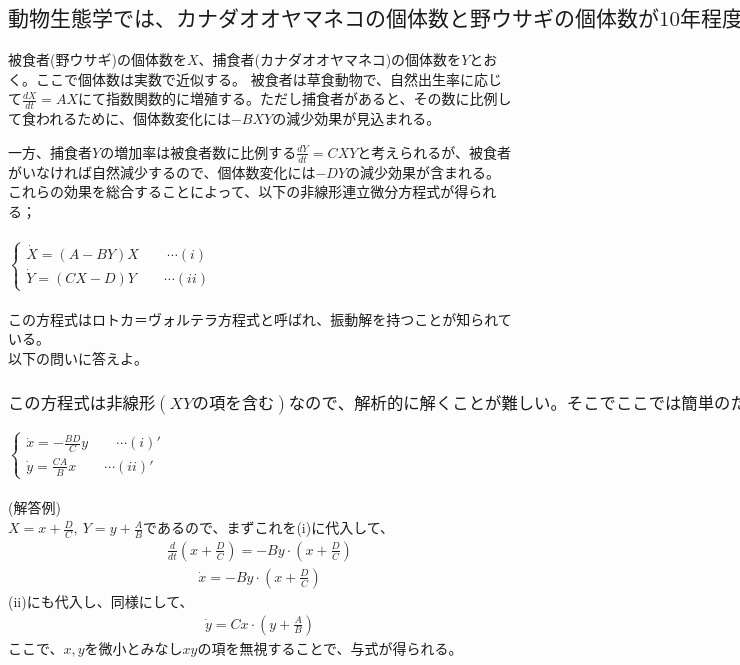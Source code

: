 \documentclass[a4paper,11pt,fleqn]{jarticle}
\begin{document}
\subsection{$動物生態学では、カナダオオヤマネコの個体数と野ウサギの個体数が10年程度の時間で振動することが知られている。以下、このダイナミクスを簡単なモデルで数理化することを考える。$}
被食者(野ウサギ)の個体数を$X$、捕食者(カナダオオヤマネコ)の個体数を$Y$とおく。ここで個体数は実数で近似する。
被食者は草食動物で、自然出生率に応じて$\frac{dX}{dt}=AX$にて指数関数的に増殖する。ただし捕食者があると、その数に比例して食われるために、個体数変化には$-BXY$の減少効果が見込まれる。\par
一方、捕食者$Y$の増加率は被食者数に比例する$\frac{dY}{dt}=CXY$と考えられるが、被食者がいなければ自然減少するので、個体数変化には$-DY$の減少効果が含まれる。これらの効果を総合することによって、以下の非線形連立微分方程式が得られる；\\
\\
$\left\{ \begin{array}{l}
\dot{X}=(A-BY)X \qquad \cdots (i) \\
\dot{Y}=(CX-D)Y \qquad \cdots (ii)
\end{array} \right.$
\\
\\
この方程式はロトカ＝ヴォルテラ方程式と呼ばれ、振動解を持つことが知られている。\\
以下の問いに答えよ。

\subsubsection{$この方程式は非線形(XYの項を含む)なので、解析的に解くことが難しい。そこでここでは簡単のため、\dot{X}=\dot{Y}=0を満たす不動点(X,Y)=(D/C,A/B)からのずれ(x,y)=(X-D/C,Y-A/B)を考えることにする。|x|,|y|が小さいとして\mathcal{O}(xy)の項を無視することにより、以下の線形連立微分方程式を導出せよ。$}
$\left\{ \begin{array}{l}
\dot{x}=-\frac{BD}{C}y \qquad \cdots (i)'　\\
\dot{y}=\frac{CA}{B}x \qquad \cdots (ii)'
\end{array} \right.$\\
\\
(解答例)\\
$X=x+\frac{D}{C},~Y=y+\frac{A}{B}$であるので、まずこれを(i)に代入して、
\begin{eqnarray*}
\frac{d}{dt}\left(x+\frac{D}{C}\right)=-By\cdot\left(x+\frac{D}{C}\right)
\end{eqnarray*}
\begin{eqnarray*}
\dot{x}=-By\cdot\left(x+\frac{D}{C}\right)
\end{eqnarray*}
(ii)にも代入し、同様にして、
\begin{eqnarray*}
\dot{y}=Cx\cdot\left(y+\frac{A}{B}\right)
\end{eqnarray*}
ここで、$x,y$を微小とみなし$xy$の項を無視することで、与式が得られる。
\end{document}
